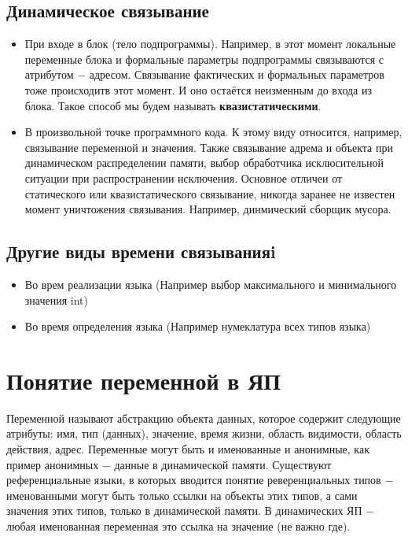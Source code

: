\documentclass[a4paper, 12pt, titlepage, finall]{extreport}
\begin{document}
            \subsection{Динамическое связывание}
                \begin{itemize}
                    \item При входе в блок (тело подпрограммы). Например, в этот момент локальные переменные блока 
                        и формальные параметры подпрограммы связываются с атрибутом $-$ адресом. Связывание фактических и формальных
                        параметров тоже происходитв этот момент. И оно остаётся неизменным до входа из блока. 
                        Такое способ мы будем называть \textbf{квазистатическими}.
                    \item В произвольной точке программного кода. К этому виду относится, например, связывание переменной и значения.
                        Также связывание адрема и объекта при динамическом распределении памяти, выбор обработчика исклюсительной 
                        ситуации при распространении исключения. Основное отличеи от статического или квазистатического связывание,
                        никогда заранее не известен момент уничтожения связывания. Например, динмический сборщик мусора.
                \end{itemize}
            \subsection{Другие виды времени связыванияi}
                \begin{itemize}
                    \item Во врем реализации языка (Например выбор максимального и минимального значения int)
                    \item Во время определения языка (Например нумеклатура всех типов языка)
                \end{itemize}
        \section{Понятие переменной в ЯП}
            Переменной называют абстракцию объекта данных, которое содержит следующие атрибуты: имя, тип (данных), значение, время жизни, область видимости, область действия, адрес.
            Переменные могут быть и именованные и анонимные, как пример анонимных $-$ данные в динамической памяти.
            Существуют референциальные языки, в которых вводится понятие реверенциальных типов $-$ именованными могут быть только ссылки на объекты этих типов,
            а сами значения этих типов, только в динамической памяти.
            В динамических ЯП $-$ любая именованная переменная это ссылка на значение (не важно где).
\end{document}

